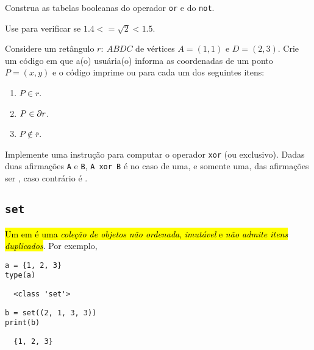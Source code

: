 \documentclass[a4paper,10pt,twoside]{article}
\begin{document}
\begin{exr}
  Construa as tabelas booleanas do operador \texttt{or} e do \texttt{not}.
\end{exr}

\begin{exr}
  Use {\python} para verificar se $1.4 <= \sqrt{2} < 1.5$.
\end{exr}

\begin{exr}
  Considere um retângulo $r: ~ABDC$ de vértices $A = (1, 1)$ e $D = (2, 3)$. Crie um código em que a(o) usuária(o) informa as coordenadas de um ponto $P = (x, y)$ e o código imprime {\PYTHONTrue} ou {\PYTHONFalse} para cada um dos seguintes itens:
  \begin{enumerate}
  \item $P\in r$.
  \item $P\in \partial r$.
  \item $P\not\in \overline{r}$.
  \end{enumerate}
\end{exr}

\begin{exr}
  Implemente uma instrução para computar o operador \texttt{xor} (ou exclusivo). Dadas duas afirmações \texttt{A} e \texttt{B}, \texttt{A xor B} é {\PYTHONTrue} no caso de uma, e somente uma, das afirmações ser {\PYTHONFalse}, caso contrário é {\PYTHONFalse}.
\end{exr}


\subsection{\texttt{set}}

\hl{Um {\PYTHONset} em {\python} é uma \emph{coleção de objetos} \emph{não ordenada}, \emph{imutável} e \emph{não admite itens duplicados}}. Por exemplo,

\begin{lstlisting}
a = {1, 2, 3}
type(a)  
\end{lstlisting}

\begin{verbatim}
  <class 'set'>
\end{verbatim}

\begin{lstlisting}
b = set((2, 1, 3, 3))
print(b)
\end{lstlisting}

\begin{verbatim}
  {1, 2, 3}
\end{verbatim}
\end{document}
